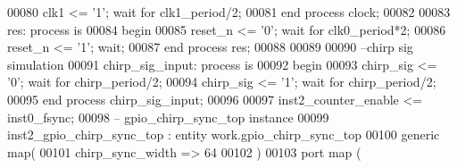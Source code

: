 \begin{DoxyCode}
00080         \textcolor{vhdlchar}{clk1} \textcolor{vhdlchar}{<=} \textcolor{vhdlchar}{'}\textcolor{vhdllogic}{}\textcolor{vhdllogic}{1}\textcolor{vhdlchar}{'}; \textcolor{keywordflow}{wait} \textcolor{keywordflow}{for} \textcolor{vhdlchar}{clk1_period}\textcolor{vhdlchar}{/}\textcolor{vhdllogic}{}\textcolor{vhdllogic}{2};
00081     \textcolor{keywordflow}{end} \textcolor{keywordflow}{process} \textcolor{vhdlchar}{clock};
00082     
00083         res: \textcolor{keywordflow}{process} \textcolor{keywordflow}{is}
00084 \textcolor{vhdlkeyword}{    begin}
00085         \textcolor{vhdlchar}{reset_n} \textcolor{vhdlchar}{<=} \textcolor{vhdlchar}{'}\textcolor{vhdllogic}{}\textcolor{vhdllogic}{0}\textcolor{vhdlchar}{'}; \textcolor{keywordflow}{wait} \textcolor{keywordflow}{for} \textcolor{vhdlchar}{clk0_period}\textcolor{vhdlchar}{*}\textcolor{vhdllogic}{}\textcolor{vhdllogic}{2};
00086         \textcolor{vhdlchar}{reset_n} \textcolor{vhdlchar}{<=} \textcolor{vhdlchar}{'}\textcolor{vhdllogic}{}\textcolor{vhdllogic}{1}\textcolor{vhdlchar}{'}; \textcolor{keywordflow}{wait};
00087     \textcolor{keywordflow}{end} \textcolor{keywordflow}{process} \textcolor{vhdlchar}{res};
00088 
00089     
00090 \textcolor{keyword}{--chirp sig simulation}
00091     chirp\_sig\_input: \textcolor{keywordflow}{process} \textcolor{keywordflow}{is}
00092 \textcolor{vhdlkeyword}{    begin}
00093          \textcolor{vhdlchar}{chirp_sig} \textcolor{vhdlchar}{<=} \textcolor{vhdlchar}{'}\textcolor{vhdllogic}{}\textcolor{vhdllogic}{0}\textcolor{vhdlchar}{'}; \textcolor{keywordflow}{wait} \textcolor{keywordflow}{for} \textcolor{vhdlchar}{chirp_period}\textcolor{vhdlchar}{/}\textcolor{vhdllogic}{}\textcolor{vhdllogic}{2};
00094          \textcolor{vhdlchar}{chirp_sig} \textcolor{vhdlchar}{<=} \textcolor{vhdlchar}{'}\textcolor{vhdllogic}{}\textcolor{vhdllogic}{1}\textcolor{vhdlchar}{'}; \textcolor{keywordflow}{wait} \textcolor{keywordflow}{for} \textcolor{vhdlchar}{chirp_period}\textcolor{vhdlchar}{/}\textcolor{vhdllogic}{}\textcolor{vhdllogic}{2};
00095     \textcolor{keywordflow}{end} \textcolor{keywordflow}{process} \textcolor{vhdlchar}{chirp\_sig\_input};
00096     
00097     inst2\_counter\_enable <= inst0\_fsync;
00098 \textcolor{keyword}{-- gpio\_chirp\_sync\_top instance}
00099     inst2\_gpio\_chirp\_sync\_top : \textcolor{keywordflow}{entity} work.gpio_chirp_sync_top
00100 \textcolor{keywordflow}{generic} \textcolor{keywordflow}{map}(
00101     chirp_sync_width        => \textcolor{vhdllogic}{64}
00102 \textcolor{vhdlchar}{)}
00103 \textcolor{keywordflow}{port} \textcolor{keywordflow}{map} (

\end{DoxyCode}
